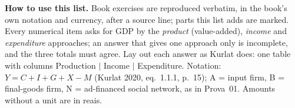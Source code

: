 \documentclass[11pt,a4paper]{article}
\begin{document}
\cabecalho

{\footnotesize\noindent\textbf{How to use this list.} Book exercises are reproduced verbatim, in the book's own notation and
currency, after a source line; parts this list adds are marked. Every numerical item asks for GDP by the \emph{product} (value-added),
\emph{income} and \emph{expenditure} approaches; an answer that gives one approach only is incomplete, and the
three totals must agree. Lay out each answer as Kurlat does: one table with columns Production $|$ Income $|$
Expenditure. Notation: $Y=C+I+G+X-M$ (Kurlat 2020, eq.~1.1.1, p.~15); A = input firm, B = final-goods firm,
N = ad-financed social network, as in Prova~01. Amounts without a unit are in reais.\par}




\end{document}

